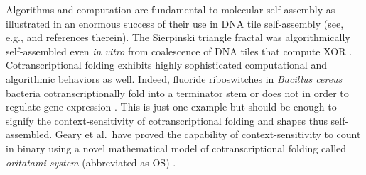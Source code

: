 Algorithms and computation are fundamental to molecular self-assembly as illustrated in an enormous success of their use in DNA tile self-assembly (see, e.g., \cite{Doty2012,Patitz2016,WinfreePhD} and references therein). 
The Sierpinski triangle fractal was algorithmically self-assembled even \textit{in vitro} from coalescence of DNA tiles that compute XOR \cite{RothemundPapadakisWinfree2004}. 
Cotranscriptional folding exhibits highly sophisticated computational and algorithmic behaviors as well. 
Indeed, fluoride riboswitches in \textit{Bacillus cereus} bacteria cotranscriptionally fold into a terminator stem or does not in order to regulate gene expression \cite{WaStYuLiLu2016}. %
This is just one example but should be enough to signify the context-sensitivity of cotranscriptional folding and shapes thus self-assembled. 
Geary et al.~have proved the capability of context-sensitivity to count in binary using a novel mathematical model of cotranscriptional folding called \textit{oritatami system} (abbreviated as OS) \cite{GeMeScSe2016}. 


